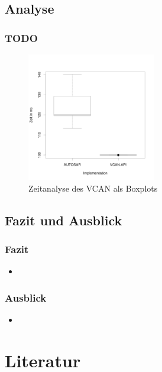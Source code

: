\documentclass[]{beamer}
\begin{document}
\subsection{Analyse}
\begin{frame}
\frametitle{TODO}
    \begin{figure}
        \centering
        \includegraphics[width=0.5\textwidth]{boxplot}
        \caption[Zeitanalyse des VCAN als Boxplots]{Zeitanalyse des VCAN als Boxplots}
        \label{fig:timinganalyse}
    \end{figure}
\end{frame}



\subsection{Fazit und Ausblick}
\begin{frame}
\frametitle{Fazit}
    \begin{itemize}
        \item 
    \end{itemize}
\end{frame}


\begin{frame}
\frametitle{Ausblick}
    \begin{itemize}
        \item
    \end{itemize}
\end{frame}










\appendix
\section*{Literatur}
\label{sec:Literatur}
\end{document}
